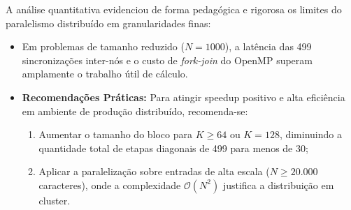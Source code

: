 \documentclass[12pt,a4paper]{article}
\begin{document}
A análise quantitativa evidenciou de forma pedagógica e rigorosa os limites do paralelismo distribuído em granularidades finas:
\begin{itemize}
    \item Em problemas de tamanho reduzido ($N = 1000$), a latência das 499 sincronizações inter-nós e o custo de \textit{fork-join} do OpenMP superam amplamente o trabalho útil de cálculo.
    \item \textbf{Recomendações Práticas:} Para atingir speedup positivo e alta eficiência em ambiente de produção distribuído, recomenda-se:
    \begin{enumerate}
        \item Aumentar o tamanho do bloco para $K \ge 64$ ou $K = 128$, diminuindo a quantidade total de etapas diagonais de 499 para menos de 30;
        \item Aplicar a paralelização sobre entradas de alta escala ($N \ge 20.000$ caracteres), onde a complexidade $\mathcal{O}(N^2)$ justifica a distribuição em cluster.
    \end{enumerate}
\end{itemize}
\end{document}
